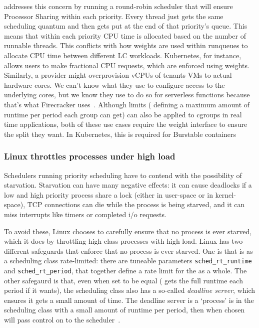 \schedrr{} addresses this concern by running a round-robin scheduler that will
ensure Processor Sharing within each priority. Every thread just gets the same
scheduling quantum and then gets put at the end of that priority's queue. This
means that within each priority CPU time is allocated based on the number of
runnable threads. This conflicts with how weights are used within runqueues to
allocate CPU time between different LC workloads. Kubernetes, for instance,
allows users to make fractional CPU requests, which are enforced using
weights.
Similarly, a provider might overprovision vCPUs of tenants VMs to actual
hardware cores. We can't know what they use to configure access to the
underlying cores, but we know they use \cgroups{} to do so for serverless
functions because that's what Firecracker uses~\cite{firecracker-cgroups}.
Although \cgroups{} limits (\ie{} defining a maximum amount of runtime per
period each group can get) can also be applied to cgroups in real time
applications, both of these use cases require the weight interface to ensure the
split they want. In Kubernetes, this is required for Burstable containers 

\subsubsection{Linux throttles \rtclass{} processes under high load
}\label{sss:approach:linux:starve-throttle}

Schedulers running priority scheduling have to contend with the possibility of
starvation. Starvation can have many negative effects: it can cause deadlocks if
a low and high priority process share a lock (either in user-space or in
kernel-space), TCP connections can die while the process is being starved, and
it can miss interrupts like timers or completed i/o requests.

To avoid these, Linux chooses to carefully ensure that no process is ever
starved, which it does by throttling high class processes with high load. Linux
has two different safeguards that enforce that no process is ever starved. One
is that \rtclass{} is as a scheduling class rate-limited: there are tuneable
parameters \texttt{sched\_rt\_runtime} and \texttt{sched\_rt\_period}, that
together define a rate limit for the \rtclass{} as a whole. The other safegaurd
is that, even when set to be equal (\ie{} \rtclass{} gets the full runtime each
period if it wants), the \normalclass{} scheduling class also has a so-called
\textit{deadline server}, which ensures it gets a small amount of time. The
deadline server is a `process' is in the \deadlineclass{} scheduling class with
a small amount of runtime per period, then when chosen will pass control on to
the \normalclass{} scheduler~\cite{lkml-deadline-srv}.

